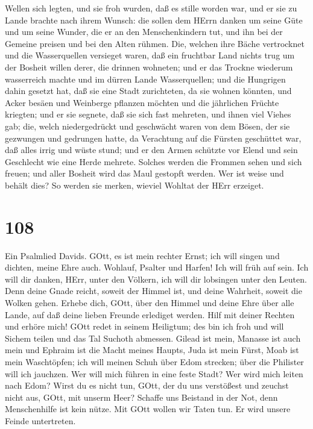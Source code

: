 Wellen sich legten,  und sie froh wurden, daß es stille
worden war, und er sie zu Lande brachte nach ihrem Wunsch: 
die sollen dem HErrn danken um seine Güte und um seine Wunder, die er an
den Menschenkindern tut,  und ihn bei der Gemeine preisen
und bei den Alten rühmen.  Die, welchen ihre Bäche
vertrocknet und die Wasserquellen versieget waren,  daß ein
fruchtbar Land nichts trug um der Bosheit willen derer, die drinnen
wohneten;  und er das Trockne wiederum wasserreich machte
und im dürren Lande Wasserquellen;  und die Hungrigen dahin
gesetzt hat, daß sie eine Stadt zurichteten, da sie wohnen könnten,
 und Acker besäen und Weinberge pflanzen möchten und die
jährlichen Früchte kriegten;  und er sie segnete, daß sie
sich fast mehreten, und ihnen viel Viehes gab;  die, welch
niedergedrückt und geschwächt waren von dem Bösen, der sie gezwungen und
gedrungen hatte,  da Verachtung auf die Fürsten geschüttet
war, daß alles irrig und wüste stund;  und er den Armen
schützte vor Elend und sein Geschlecht wie eine Herde mehrete.
 Solches werden die Frommen sehen und sich freuen; und
aller Bosheit wird das Maul gestopft werden.  Wer ist weise
und behält dies? So werden sie merken, wieviel Wohltat der HErr
erzeiget.

\hypertarget{section-107}{%
\section{108}\label{section-107}}

 Ein Psalmlied Davids.  GOtt, es ist mein
rechter Ernst; ich will singen und dichten, meine Ehre auch.
 Wohlauf, Psalter und Harfen! Ich will früh auf sein.
 Ich will dir danken, HErr, unter den Völkern, ich will dir
lobsingen unter den Leuten.  Denn deine Gnade reicht, soweit
der Himmel ist, und deine Wahrheit, soweit die Wolken gehen.
 Erhebe dich, GOtt, über den Himmel und deine Ehre über alle
Lande,  auf daß deine lieben Freunde erlediget werden. Hilf
mit deiner Rechten und erhöre mich!  GOtt redet in seinem
Heiligtum; des bin ich froh und will Sichem teilen und das Tal Suchoth
abmessen.  Gilead ist mein, Manasse ist auch mein und
Ephraim ist die Macht meines Haupts, Juda ist mein Fürst, 
Moab ist mein Waschtöpfen; ich will meinen Schuh über Edom strecken;
über die Philister will ich jauchzen.  Wer will mich führen
in eine feste Stadt? Wer wird mich leiten nach Edom?  Wirst
du es nicht tun, GOtt, der du uns verstößest und zeuchst nicht aus,
GOtt, mit unserm Heer?  Schaffe uns Beistand in der Not,
denn Menschenhilfe ist kein nütze.  Mit GOtt wollen wir
Taten tun. Er wird unsere Feinde untertreten.

